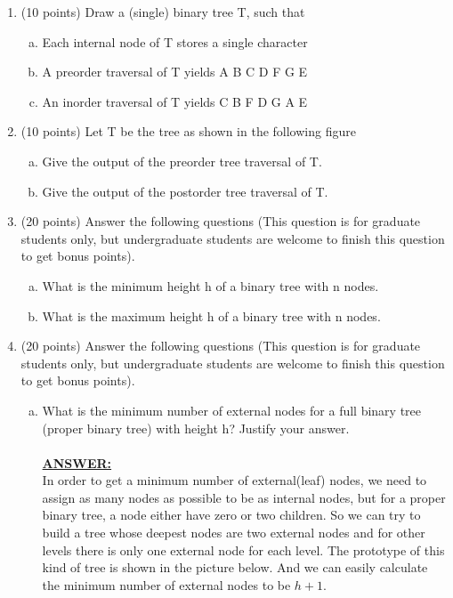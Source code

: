 \documentclass{article}
\newcommand{\answer}{\textbf{\\\underline{ANSWER:}\\}}
\begin{document}
\begin{enumerate}
\item(10 points) Draw a (single) binary tree T, such that
\begin{enumerate}[(a)]
\item Each internal node of T stores a single character
\item A preorder traversal of T yields A B C D F G E
\item An inorder traversal of T yields C B F D G A E 
\hspace{1em}
\end{enumerate}


\item(10 points) Let T be the tree as shown in the following figure


\begin{enumerate}[(a)]
\item Give the output of the preorder tree traversal of
  T.  
\item Give the output of the postorder tree traversal of
  T.  
\end{enumerate}

\item(20 points) Answer the following questions (This question is for
graduate students only, but undergraduate students are welcome to
finish this question to get bonus points). 
\begin{enumerate}[(a)]
\item What is the minimum height h of a binary tree with n nodes.
\item What is the maximum height h of a binary tree with n nodes.
\end{enumerate}

\item(20 points) Answer the following questions (This question is for
graduate students only, but undergraduate students are welcome to
finish this question to get bonus points).
\begin{enumerate}[(a)]
\item What is the minimum number of external nodes for a full
  binary tree (proper binary tree) with height h? Justify your answer.\\
  \answer In order to get a minimum number of external(leaf) nodes, we
    need to assign as many nodes as possible to be as internal nodes,
    but for a proper binary tree, a node either have zero or two
    children. So we can try to build a tree whose deepest nodes are
    two external nodes and for other levels there is only one external
    node for each level. The prototype of this kind of tree is shown
    in the picture below. And we can easily calculate the minimum
    number of external nodes to be $h+1$.  \\
    
      


\end{enumerate}
\end{enumerate}
\end{document}
